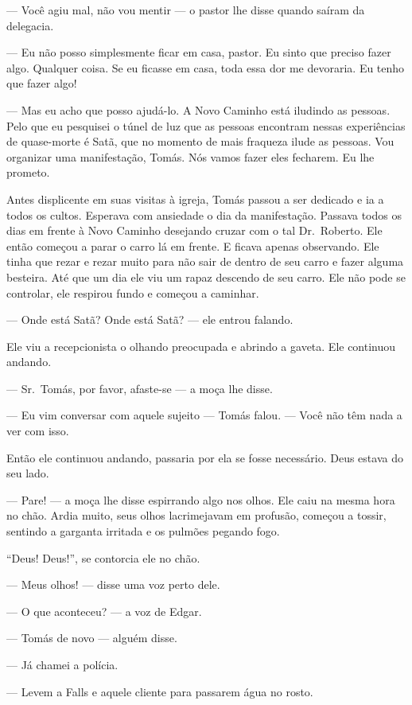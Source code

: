 --- Você agiu mal, não vou mentir --- o pastor lhe disse\mudanca{,} quando saíram da delegacia.

--- Eu não posso simplesmente ficar em casa, pastor. Eu sinto que preciso fazer algo. Qualquer coisa. Se eu ficasse em casa, toda essa dor me devoraria. Eu tenho que fazer algo!

--- Mas eu acho que posso ajudá-lo. A Novo Caminho está iludindo as pessoas. Pelo que eu pesquisei o túnel de luz que as pessoas encontram nessas experiências de quase-morte é Satã, que no momento de mais fraqueza ilude as pessoas. Vou organizar uma manifestação, Tomás. Nós vamos fazer eles fecharem. Eu lhe prometo.

Antes displicente em suas visitas à igreja, Tomás passou a ser dedicado e ia a todos os cultos. Esperava com ansiedade o dia da manifestação. Passava todos os dias em frente à Novo Caminho desejando cruzar com o tal Dr.~Roberto. Ele então começou a parar o carro lá em frente. E ficava apenas observando. Ele tinha que rezar e rezar muito para não sair de dentro de seu carro e fazer alguma besteira. Até que um dia ele viu um rapaz descendo de seu carro. Ele não pode se controlar, ele respirou fundo e começou a caminhar.

--- Onde está Satã? Onde está Satã? --- ele entrou falando.

Ele viu a recepcionista o olhando preocupada e abrindo a gaveta. Ele continuou andando.

--- Sr.~Tomás, por favor, afaste-se --- a moça lhe disse.

--- Eu vim conversar com aquele sujeito --- Tomás falou. --- Você não têm nada a ver com isso.

Então ele continuou andando, passaria por ela se fosse necessário. Deus estava do seu lado.

--- Pare! --- a moça lhe\mudanca{,} disse espirrando algo nos olhos. Ele caiu na mesma hora no chão. Ardia muito, seus olhos lacrimejavam em profusão, começou a tossir, sentindo a garganta irritada e os pulmões pegando fogo.

``Deus! Deus!'', se contorcia ele no chão.

--- Meus olhos! --- disse uma\mudanca{,} voz perto dele.

--- O que aconteceu? ---  a voz de Edgar.

--- Tomás de novo --- alguém disse.

--- Já chamei a polícia.

--- Levem a Falls e aquele cliente para passarem água no rosto.

